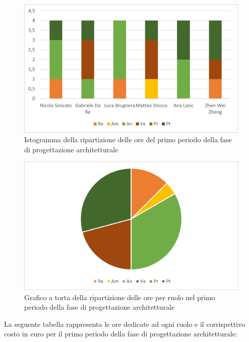 \begin{figure}[H]
    \centering
    \includegraphics[scale=0.6]{img/grafi preventivo/istogrammi/architetturale/periodo1.png}
    \caption{Istogramma della ripartizione delle ore del primo periodo della fase di progettazione architetturale}
\end{figure}
\begin{figure}[H]
    \centering
    \includegraphics[scale=0.6]{img/grafi preventivo/torta/architetturale/periodo1.png}
    \caption{Grafico a torta della ripartizione delle ore per ruolo nel primo periodo della fase di progettazione architetturale}
\end{figure}
La seguente tabella rappresenta le ore dedicate ad ogni ruolo e il corrispettivo costo in euro per il primo periodo della fase di progettazione architetturale:

